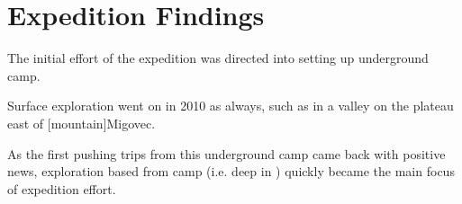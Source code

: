 \section{Expedition Findings}

The initial effort of the expedition was directed into setting up underground camp.

    \begin{marginfigure}
\checkoddpage \ifoddpage \forcerectofloat \else \forceversofloat \fi
\centering
 \caption{Surface exploration went on in 2010 as always, such as in a valley on the plateau east of [mountain]Migovec. }
 \label{valley east of Mig}
\end{marginfigure}

As the first pushing trips from this underground camp came back with
positive news, exploration based from camp (i.e. deep in ) quickly became the main focus of expedition effort.

